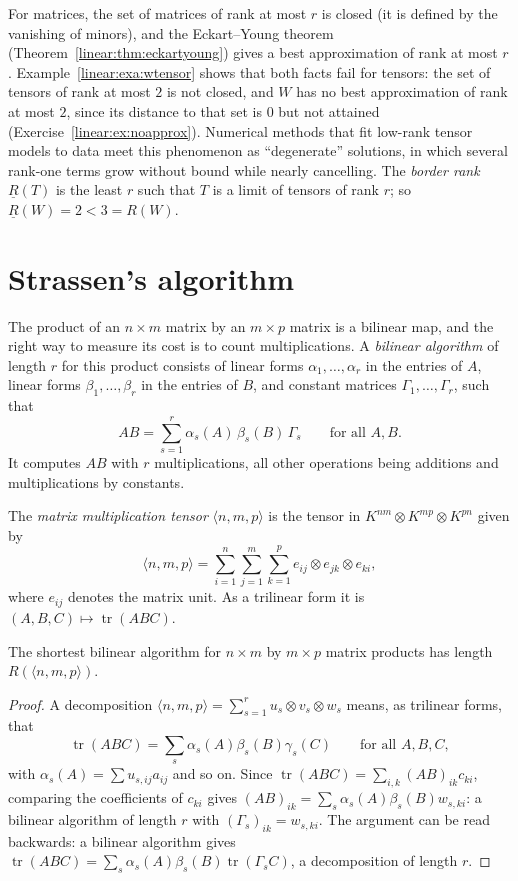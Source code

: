 For matrices, the set of matrices of rank at most $r$ is closed (it is defined by the vanishing of minors), and the Eckart--Young
theorem (Theorem~\ref{linear:thm:eckartyoung}) gives a best approximation of rank at most $r$. Example~\ref{linear:exa:wtensor} shows that both
facts fail for tensors: the set of tensors of rank at most $2$ is not closed, and $W$ has no best approximation of rank at most
$2$, since its distance to that set is $0$ but not attained (Exercise~\ref{linear:ex:noapprox}). Numerical methods that fit low-rank tensor
models to data meet this phenomenon as ``degenerate'' solutions, in which several rank-one terms grow without bound while
nearly cancelling. The \emph{border rank} $\underline R(T)$ is the least $r$ such that $T$ is a limit of tensors of rank $r$; so
$\underline R(W)=2<3=R(W)$.

\section{Strassen's algorithm}

The product of an $n\times m$ matrix by an $m\times p$ matrix is a bilinear map, and the right way to measure its cost is to count
multiplications. A \emph{bilinear algorithm} of length $r$ for this product consists of linear forms $\alpha_1,\dots,\alpha_r$ in the
entries of $A$, linear forms $\beta_1,\dots,\beta_r$ in the entries of $B$, and constant matrices $\Gamma_1,\dots,\Gamma_r$, such that
\[
AB=\sum_{s=1}^r\alpha_s(A)\,\beta_s(B)\,\Gamma_s\qquad\text{for all }A,B.
\]
It computes $AB$ with $r$ multiplications, all other operations being additions and multiplications by constants.

\begin{definition}\label{linear:def:mmtensor}
The \emph{matrix multiplication tensor} $\langle n,m,p\rangle$ is the tensor in $K^{nm}\otimes K^{mp}\otimes K^{pn}$ given by
\[
\langle n,m,p\rangle=\sum_{i=1}^n\sum_{j=1}^m\sum_{k=1}^pe_{ij}\otimes e_{jk}\otimes e_{ki},
\]
where $e_{ij}$ denotes the matrix unit. As a trilinear form it is $(A,B,C)\mapsto\operatorname{tr}(ABC)$.
\end{definition}

\begin{theorem}\label{linear:thm:bilinear}
The shortest bilinear algorithm for $n\times m$ by $m\times p$ matrix products has length $R(\langle n,m,p\rangle)$.
\end{theorem}
\begin{proof}
A decomposition $\langle n,m,p\rangle=\sum_{s=1}^ru_s\otimes v_s\otimes w_s$ means, as trilinear forms, that
\[
\operatorname{tr}(ABC)=\sum_s\alpha_s(A)\beta_s(B)\gamma_s(C)\qquad\text{for all }A,B,C,
\]
with $\alpha_s(A)=\sum u_{s,ij}a_{ij}$ and so on. Since $\operatorname{tr}(ABC)=\sum_{i,k}(AB)_{ik}c_{ki}$, comparing the coefficients of $c_{ki}$ gives $(AB)_{ik}=\sum_s\alpha_s(A)\beta_s(B)w_{s,ki}$: a bilinear
algorithm of length $r$ with $(\Gamma_s)_{ik}=w_{s,ki}$. The argument can be read backwards: a bilinear algorithm gives
$\operatorname{tr}(ABC)=\sum_s\alpha_s(A)\beta_s(B)\operatorname{tr}(\Gamma_sC)$, a decomposition of length $r$.
\end{proof}

